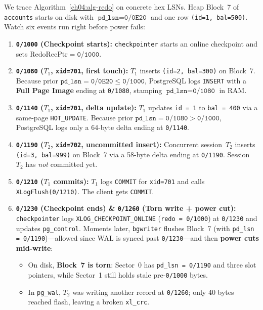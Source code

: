 We trace Algorithm~\ref{ch04:alg-redo} on concrete hex LSNs. Heap Block~7 of \texttt{accounts} starts on disk with $\texttt{pd\_lsn} = \texttt{0/0E20}$ and one row \texttt{(id=1, bal=500)}. Watch six events run right before power fails:

\begin{enumerate}
  \item \textbf{\texttt{0/1000} (Checkpoint starts):} \texttt{checkpointer} starts an online checkpoint and sets $\mathrm{RedoRecPtr} = \texttt{0/1000}$.
  \item \textbf{\texttt{0/1080} ($T_1$, \texttt{xid=701}, first touch):} $T_1$ inserts \texttt{(id=2, bal=300)} on Block~7. Because prior $\texttt{pd\_lsn} = \texttt{0/0E20} \le \texttt{0/1000}$, PostgreSQL logs \texttt{INSERT} with a \textbf{Full Page Image} ending at \texttt{0/1080}, stamping $\texttt{pd\_lsn} = \texttt{0/1080}$ in RAM.
  \item \textbf{\texttt{0/1140} ($T_1$, \texttt{xid=701}, delta update):} $T_1$ updates \texttt{id = 1} to \texttt{bal = 400} via a same-page \texttt{HOT\_UPDATE}. Because prior $\texttt{pd\_lsn} = \texttt{0/1080} > \texttt{0/1000}$, PostgreSQL logs only a 64-byte delta ending at \texttt{0/1140}.
  \item \textbf{\texttt{0/1190} ($T_2$, \texttt{xid=702}, uncommitted insert):} Concurrent session~$T_2$ inserts \texttt{(id=3, bal=999)} on Block~7 via a 58-byte delta ending at \texttt{0/1190}. Session~$T_2$ has \emph{not} committed yet.
  \item \textbf{\texttt{0/1210} ($T_1$ commits):} $T_1$ logs \texttt{COMMIT} for \texttt{xid=701} and calls \texttt{XLogFlush(0/1210)}. The client gets \texttt{COMMIT}.
  \item \textbf{\texttt{0/1230} (Checkpoint ends) \& \texttt{0/1260} (Torn write + power cut):} \texttt{checkpointer} logs \texttt{XLOG\_CHECKPOINT\_ONLINE} (\texttt{redo = 0/1000}) at \texttt{0/1230} and updates \texttt{pg\_control}. Moments later, \texttt{bgwriter} flushes Block~7 (with \texttt{pd\_lsn = 0/1190})---allowed since WAL is synced past \texttt{0/1230}---and then \textbf{power cuts mid-write}:
    \begin{itemize}
      \item On disk, \textbf{Block~7 is torn}: Sector~0 has \texttt{pd\_lsn = 0/1190} and three slot pointers, while Sector~1 still holds stale pre-\texttt{0/1000} bytes.
      \item In \texttt{pg\_wal}, $T_2$ was writing another record at \texttt{0/1260}; only 40 bytes reached flash, leaving a broken \texttt{xl\_crc}.
    \end{itemize}
\end{enumerate}

